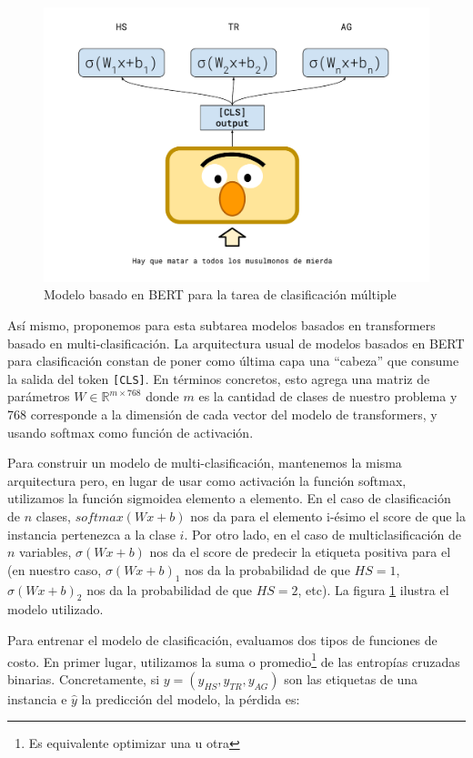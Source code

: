 \begin{figure}
    \centering
    \includegraphics[width=\textwidth]{img/bert_model_hateval.pdf}
    \caption{Modelo basado en BERT para la tarea de clasificación múltiple}
    \label{fig:bert_hateval_classifier}
\end{figure}


Así mismo, proponemos para esta subtarea modelos basados en transformers basado en multi-clasificación. La arquitectura usual de modelos basados en BERT para clasificación constan de poner como última capa una  ``cabeza'' que consume la salida del token \verb|[CLS]|. En términos concretos, esto agrega una matriz de parámetros $W \in \mathbb{R}^{m \times 768}$ donde $m$ es la cantidad de clases de nuestro problema y 768 corresponde a la dimensión de cada vector del modelo de transformers, y usando softmax como función de activación.

Para construir un modelo de multi-clasificación, mantenemos la misma arquitectura pero, en lugar de usar como activación la función softmax, utilizamos la función sigmoidea elemento a elemento. En el caso de clasificación de $n$ clases, $softmax(W x + b)$ nos da para el elemento i-ésimo el score de que la instancia pertenezca a la clase $i$. Por otro lado, en el caso de multiclasificación de $n$ variables, $\sigma(W x + b)$ nos da el score de predecir la etiqueta positiva para el (en nuestro caso,  $\sigma(W x + b)_1$ nos da la probabilidad de que $HS = 1$,  $\sigma(W x + b)_2$ nos da la probabilidad de que $HS = 2$, etc). La figura \ref{fig:bert_hateval_classifier} ilustra el modelo utilizado.

Para entrenar el modelo de clasificación, evaluamos dos tipos de funciones de costo. En primer lugar, utilizamos la suma o promedio\footnote{Es equivalente optimizar una u otra} de las entropías cruzadas binarias. Concretamente, si $y = (y_{HS}, y_{TR}, y_{AG})$ son las etiquetas de una instancia e $\widehat{y}$ la predicción del modelo, la pérdida es:

